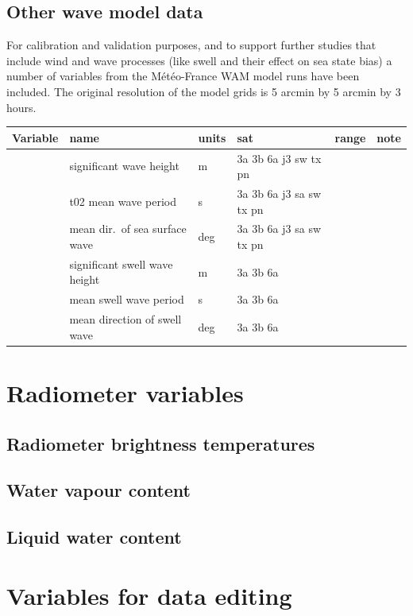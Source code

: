 \documentclass[a4paper,11pt,openany,natbib,nomargin]{thesis}
\newenvironment{vartable}{
\begin{table}[ht]
\small
\begin{tabular}{lllllr}
\hline\hline
Variable & name & units & sat & range & note \\
\hline\hline
}{
\hline
\end{tabular}
\end{table}
}
\begin{document}
\section{Other wave model data}
\label{var:wave}
For calibration and validation purposes, and to support further studies that include wind and wave processes (like swell and their effect on sea state bias) a number of variables from the
M\'et\'eo-France WAM model runs have been included. The original resolution of the model grids is 5 arcmin by 5 arcmin by 3 hours.

\begin{vartable}
\var{swh_mfwam} & significant wave height & m & 3a 3b 6a j3 sw tx pn & & \\
\var{mean_wave_period} & t02 mean wave period& s & 3a 3b 6a j3 sa sw tx pn & & \\
\var{mean_wave_direction} & mean dir.\ of sea surface wave & deg & 3a 3b 6a j3 sa sw tx pn & & \\
\var{significant_swell_wave_height} & significant swell wave height & m & 3a 3b 6a & & \\
\var{mean_swell wave_period} & mean swell wave period & s & 3a 3b 6a & & \\
\var{mean_swell_wave_direction} & mean direction of swell wave & deg & 3a 3b 6a & & \\
\end{vartable}

\chapter{Radiometer variables}

\section{Radiometer brightness temperatures}
\label{var:tb}
\section{Water vapour content}
\section{Liquid water content}

\chapter{Variables for data editing}
\end{document}
